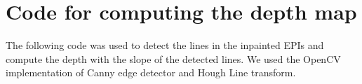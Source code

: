 \chapter{Code for computing the depth map}
\label{sec:Appendix_D}

The following code was used to detect the lines in the inpainted EPIs and compute the depth with the slope of the detected lines. We used the OpenCV implementation of Canny edge detector and Hough Line transform.



